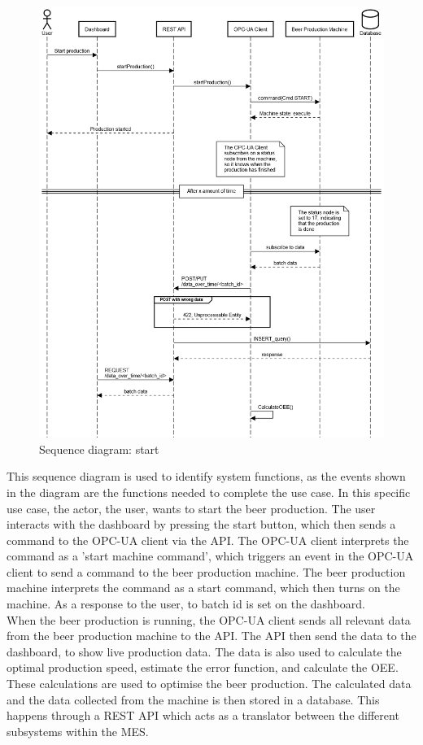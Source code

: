 \begin{figure}[H]
\centering 
\includegraphics[width=1\linewidth]{images/sequence_operation/start.png}
\caption{Sequence diagram: start}
\label{figure:sequence_diagram} 
\end{figure}

This sequence diagram is used to identify system functions, as the events shown
in the diagram are the functions needed to complete the use case. In this
specific use case, the actor, the user, wants to start the beer production.
The user interacts with the dashboard by pressing the start button,
which then sends a command to the OPC-UA client via the API. The OPC-UA client
interprets the command as a 'start machine command', which triggers an event in
the OPC-UA client to send a command to the beer production machine. The beer
production machine interprets the command as a start command, which then turns
on the machine. As a response to the user, to batch id is set on the dashboard.\\

When the beer production is running, the OPC-UA client sends all relevant
data from the beer production machine to the API. The API then send the data to
the dashboard, to show live production data. The data is also used to calculate
the optimal production speed, estimate the error function, and calculate the OEE.
These calculations are used to optimise the beer production. The calculated data
and the data collected from the machine is then stored in a database. This
happens through a REST API which acts as a translator between the different 
subsystems within the MES.


